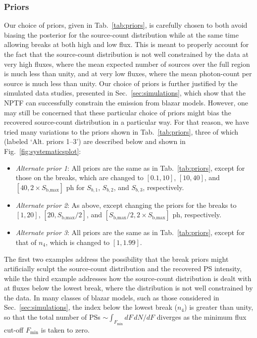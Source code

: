 \subsubsection{Priors}

Our choice of priors, given in Tab.~\ref{tab:priors}, is carefully chosen to both avoid biasing the posterior for the source-count distribution while at the same time allowing breaks at both high and low flux.  This is meant to properly account for the fact that the source-count distribution is not well constrained by the data at very high fluxes, where the mean expected number of sources over the full region is much less than unity, and at very low fluxes, where the mean photon-count per source is much less than unity.  Our choice of priors is further justified by the simulated data studies, presented in Sec.~\ref{sec:simulations}, which show that the NPTF can successfully constrain the emission from blazar models.  However, one may still be concerned that these particular choice of priors might bias the recovered source-count distribution in a particular way.  For that reason, we have tried many variations to the priors shown in Tab.~\ref{tab:priors}, three of which (labeled `Alt. priors 1--3')  are described below and shown in Fig.~\ref{fig:systematicsplot}:
\begin{itemize}
\item {\it Alternate prior 1}:  All priors are the same as in Tab.~\ref{tab:priors}, except for those on the breaks, which are changed to $[0.1,10]$, $[10,40]$, and $[40, 2 \times S_\text{b,max}]$ ph for $S_{b,1}$, $S_{b,2}$, and $S_{b,3}$, respectively. 
\item {\it Alternate prior 2}:  As above, except changing the priors for the breaks to $[1,20]$, $[20,S_\text{b,max}/2]$, and $[S_\text{b,max}/2, 2 \times S_\text{b,max}]$ ph, respectively.
\item {\it Alternate prior 3}:  All priors are the same as in Tab.~\ref{tab:priors}, except for that of $n_4$, which is changed to $[1,1.99]$.
\end{itemize}

The first two examples address the possibility that the break priors might artificially sculpt the source-count distribution and the recovered PS intensity, while the third example addresses how the source-count distribution is dealt with at fluxes below the lowest break, where the distribution is not well constrained by the data.  In many classes of blazar models, such as those considered in Sec.~\ref{sec:simulations}, the index below the lowest break ($n_4$) is greater than unity, so that the total number of PSs $\sim$$\int_{F_\text{min}} dF \, dN / dF$ diverges as the minimum flux cut-off $F_\text{min}$ is taken to zero.

